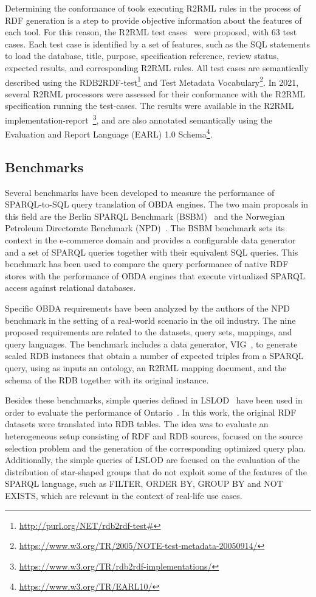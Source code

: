 Determining the conformance of tools executing R2RML rules in the process of RDF generation is a step to provide objective information about the features of each tool. For this reason, the R2RML test cases~\citep{R2RML_test_cases} were proposed, with 63 test cases. Each test case is identified by a set of features, such as the SQL statements to load the database, title, purpose, specification reference, review status, expected results, and corresponding R2RML rules. All test cases are semantically described using the RDB2RDF-test\footnote{\url{http://purl.org/NET/rdb2rdf-test\#}} and Test Metadata Vocabulary\footnote{\url{https://www.w3.org/TR/2005/NOTE-test-metadata-20050914/}}. In 2021, several R2RML processors were assessed for their conformance with the R2RML specification running the test-cases. The results were available in the R2RML implementation-report~\footnote{\url{https://www.w3.org/TR/rdb2rdf-implementations/}}, and are also annotated semantically using the Evaluation and Report Language (EARL) 1.0 Schema\footnote{\url{https://www.w3.org/TR/EARL10/}}.

\subsection{Benchmarks}
\label{chap2:soa-bench}
Several benchmarks have been developed to measure the performance of SPARQL-to-SQL query translation of OBDA engines. The two main proposals in this field are the Berlin SPARQL Benchmark (BSBM)~\citep{bizer2009berlin} and the Norwegian Petroleum Directorate Benchmark (NPD)~\citep{lanti2015npd}. The BSBM benchmark sets its context in the e-commerce domain and provides a configurable data generator and a set of SPARQL queries together with their equivalent SQL queries. This benchmark has been used to compare the query performance of native RDF stores with the performance of OBDA engines that execute virtualized SPARQL access against relational databases.

Specific OBDA requirements have been analyzed by the authors of the NPD benchmark in the setting of a real-world scenario in the oil industry. The nine proposed requirements are related to the datasets, query sets, mappings, and query languages. The benchmark includes a data generator, VIG~\citep{lantivig}, to generate scaled RDB instances that obtain a number of expected triples from a SPARQL query, using as inputs an ontology, an R2RML mapping document, and the schema of the RDB together with its original instance. 

Besides these benchmarks, simple queries defined in LSLOD~\citep{hasnain2017biofed} have been used in order to evaluate the performance of Ontario~\citep{endris2019ontario}. In this work, the original RDF datasets were translated into RDB tables. The idea was to evaluate an heterogeneous setup consisting of RDF and RDB sources, focused on the source selection problem and the generation of the corresponding optimized query plan. Additionally, the simple queries of LSLOD are focused on the evaluation of the distribution of star-shaped groups that do not exploit some of the features of the SPARQL language, such as FILTER, ORDER BY, GROUP BY and NOT EXISTS, which are relevant in the context of  real-life use cases.

